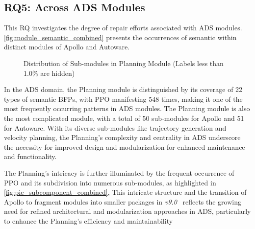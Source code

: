 \subsection{\textbf{RQ5: \BFPs Across ADS Modules}}

This RQ investigates the degree of repair efforts associated with ADS modules. 
\autoref{fig:module_semantic_combined} presents the occurrences of semantic \bfps within distinct modules of Apollo and Autoware. 


\begin{wrapfigure}[15]{r}{0.52\textwidth}
    \centering
    \vspace{-2ex}
    \noindent{}
    \vspace{-4ex}
    \caption{Distribution of Sub-modules in Planning Module (Labels less than 1.0\% are hidden)}
    \label{fig:pie_subcomponent_combined}
\end{wrapfigure}

In the ADS domain, the Planning module is distinguished by its coverage of 22 types of semantic BFPs, with PPO manifesting 548 times, making it one of the most frequently occurring patterns in ADS modules.
The Planning module is also the most complicated module, with a total of 50 sub-modules for Apollo and 51 for Autoware. With its diverse sub-modules like trajectory generation and velocity planning, the Planning's complexity and centrality in ADS underscore the necessity for improved design and modularization for enhanced maintenance and functionality.

The Planning's intricacy is further illuminated by the frequent occurrence of PPO and its subdivision into numerous sub-modules, as highlighted in \autoref{fig:pie_subcomponent_combined}, 
This intricate structure  and the transition of Apollo to fragment modules into smaller packages in \textit{v9.0}~\cite{apollo_architecture, apollo_v9} reflects the growing need for refined architectural and modularization approaches in ADS, particularly to enhance the Planning's efficiency and maintainability 

